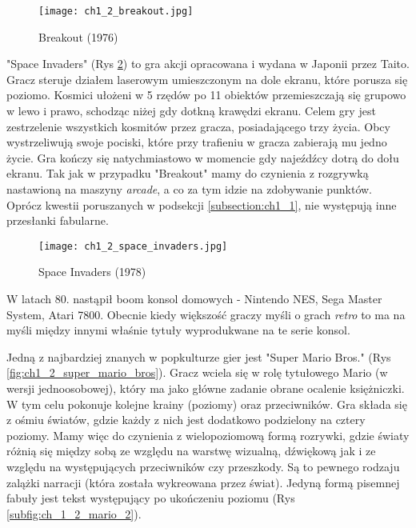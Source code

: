 \begin{figure}[h]
	\texttt{[image: ch1\_2\_breakout.jpg]}
	\caption{Breakout (1976)}
	\centering
	\label{fig:ch1_2_breakout}
\end{figure}

"Space Invaders" (Rys \ref{fig:ch1_2_space_invaders}) to gra akcji opracowana i wydana w Japonii przez Taito. Gracz steruje działem laserowym
umieszczonym na dole ekranu, które porusza się poziomo. Kosmici ułożeni w 5 rzędów po 11 obiektów
przemieszczają się grupowo w lewo i prawo, schodząc niżej gdy dotkną krawędzi ekranu. Celem gry jest
zestrzelenie wszystkich kosmitów przez gracza, posiadającego trzy życia. Obcy wystrzeliwują swoje pociski,
które przy trafieniu w gracza zabierają mu jedno życie. Gra kończy się natychmiastowo w momencie gdy
najeźdźcy dotrą do dołu ekranu. Tak jak w przypadku "Breakout" mamy do czynienia z rozgrywką nastawioną na
maszyny \textit{arcade}, a co za tym idzie na zdobywanie punktów. Oprócz kwestii poruszanych w
podsekcji \ref{subsection:ch1_1}, nie występują inne przesłanki fabularne.

\begin{figure}[h]
	\texttt{[image: ch1\_2\_space\_invaders.jpg]}
	\caption{Space Invaders (1978)}
	\centering
	\label{fig:ch1_2_space_invaders}
\end{figure}

\newpage

W latach 80. nastąpił boom konsol domowych - Nintendo NES, Sega Master System, Atari 7800\cite{the_evolution_of_video_games}.
Obecnie kiedy większość graczy myśli o grach \textit{retro} to ma na myśli między innymi właśnie tytuły
wyprodukwane na te serie konsol.

Jedną z najbardziej znanych w popkulturze gier jest "Super Mario Bros." (Rys \ref{fig:ch1_2_super_mario_bros}).
Gracz wciela się w rolę tytułowego Mario (w wersji jednoosobowej), który ma jako główne zadanie obrane
ocalenie księżniczki. W tym celu pokonuje kolejne krainy (poziomy) oraz przeciwników. Gra składa się z ośmiu
światów, gdzie każdy z nich jest dodatkowo podzielony na cztery poziomy. Mamy więc do czynienia z
wielopoziomową formą rozrywki, gdzie światy różnią się między sobą ze względu na warstwę wizualną, dźwiękową
jak i ze względu na występujących przeciwników czy przeszkody. Są to pewnego rodzaju zalążki narracji
(która została wykreowana przez świat). Jedyną formą pisemnej fabuły jest tekst występujący po ukończeniu
poziomu (Rys \ref{subfig:ch_1_2_mario_2}).

